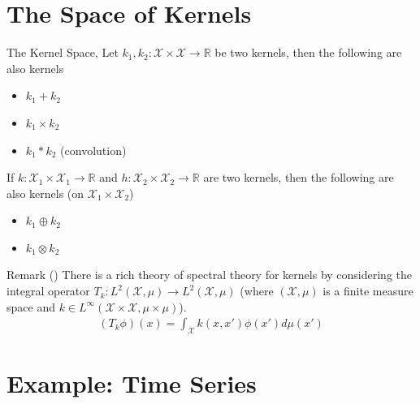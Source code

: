 \documentclass[10pt]{beamer}
\begin{document}
\section{The Space of Kernels}

\begin{frame}{The Kernel Space}{\cite{ROERGA}, \cite[Chapter 4]{RW05}}
Let $k_1, k_2: \mathcal{X}\times\mathcal{X}\longrightarrow \mathbb{R}$ be two kernels, then the following are also kernels 
\begin{itemize}
\item $k_1 + k_2$ 
\item $k_1 \times k_2$
\item $k_1*k_2$ (convolution)
\end{itemize}
If $k: \mathcal{X}_1\times\mathcal{X}_1\longrightarrow \mathbb{R}$ and $h: \mathcal{X}_2\times\mathcal{X}_2\longrightarrow \mathbb{R}$ are two kernels, then the following are also kernels (on $\mathcal{X}_1 \times \mathcal{X}_2$)
\begin{itemize}
\item $k_1 \oplus k_2$ 
\item $k_1 \otimes k_2$
\end{itemize}
\begin{block}{Remark (\cite[Chapter 4.3]{RW05})}
There is a rich theory of spectral theory for kernels by considering the integral operator $T_k : L^2(\mathcal{X}, \mu) \longrightarrow L^2(\mathcal{X}, \mu)$ (where $(\mathcal{X}, \mu)$ is a finite measure space and $k\in L^{\infty}(\mathcal{X}\times \mathcal{X} , \mu\times\mu)$). 
\begin{align*}
(T_k\phi)(x) = \int_{\mathcal{X}} k(x, x')\phi(x') d\mu(x')
\end{align*}
\end{block}
\end{frame}

\section{Example: Time Series}
\end{document}
